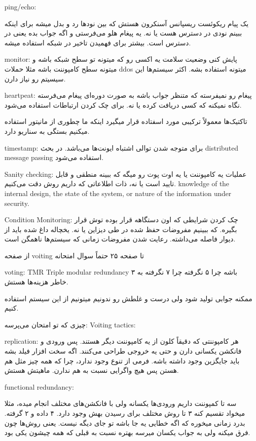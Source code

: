 ping/echo: 

یک پیام ریکوئست ریسپانس آسنکرون هستش که بین نود‌ها رد و بدل میشه برای اینکه
ببینم نودی در دسترس هست یا نه. یه پیغام هلو می‌فرستی و اگه جواب بده یعنی در
دسترس است. بیشتر برای فهمیدن تاخیر در شبکه استفاده میشه.

monitor: پایش کنی وضعیت سلامت یه اکسی رو که میتونه تو سطح شبکه باشه و میتونه سطح
کامپوننت باشه مثلا حملات ddos میتونه استفاده بشه. اکثر سیستم‌ها این سیسیتم رو
نیاز دارن.

heartpeat: پیغام رو نمیفرسته که متنظر جواب باشه به صورت دوره‌ای پیغام می‌فرسته
نگاه نمیکنه که کسی دریافت کرده یا نه. برای چک کردن ارتباطات استفاده می‌شود.

تاکتیک‌ها معمولاً ترکیبی مورد اسفتاده قرار میگیرد اینکه ما چطوری از مانیتور
استفاده میکنیم بستگی به سناریو دارد.

timestamp: برای متوجه شدن توالی اشتباه ایونت‌ها می‌باشد. در بحث distributed
message passing استفاده می‌شود.

Sanity checking: عملیات یه کامپوننت یا یه اوت پوت رو میگه که ببینه منطقی و قابل
تایید است یا نه، ذات اطلاعاتی که داریم روش دقت می‌کنیم. knowledge of the
internal design, the state of the system, or nature of the information under
security.

Condition Monitoring: چک کردن شرایطی که اون دستگاهه قرار بوده توش قرار بگیره. که
ببینیم مفروضات حفظ شده در طی دیزاین یا نه. یخچاله داغ شده باید از دیوار فاصله
می‌داشته. رعایت شدن مفروضات زمانی که سیستم‌ها ناهمگن است.

از صفحه voiting تا صفحه ۲۵ حتماً سوال امتحانه

voting: TMR Triple modular redundancy ۳ باشه چرا ۵ نگرفته چرا ۷ نگرفته به خاطر
هزینه‌ها هستش.

ممکنه جوابی تولید شود ولی درست و غلطش رو ندونیم میتونیم از این سیستم استفاده
کنیم. 

چیزی که تو امتحان می‌پرسه:
Voiting tactics:

replication: هر کامپوننتی که دقیقاً کلون از یه کامپوننت دیگر هستند. پس ورودی و
فانکشن یکسانی دارن و حتی یه خروجی طراحی می‌کنند. اگه سخت افزار فیلد بشه باید
جایگزین وجود داشته باشه. فرمی از تنوع وجود ندارد، چرا که همه چیز مثل هم هستن پس
هیچ واگرایی نسبت به هم ندارن. ماهیتش هستش.

functional redundancy:

سه تا کمپوننت داریم ورودی‌ها یکسانه ولی با فانکشن‌های مختلف انجام میده، مثلا
میخواد تقسیم کنه ۳ تا روش مختلف برای رسیدن بهش وجود دارد. ۴ داده و ۲ گرفته. بدرد
زمانی میخوره که اگه خطایی یه جا باشه تو جای دیگه نیست. یعنی روش‌ها چون فرق میکنه
ولی به جواب یکسان میرسه بهتره نسبت به قبلی که همه چیشون یکی بود.

